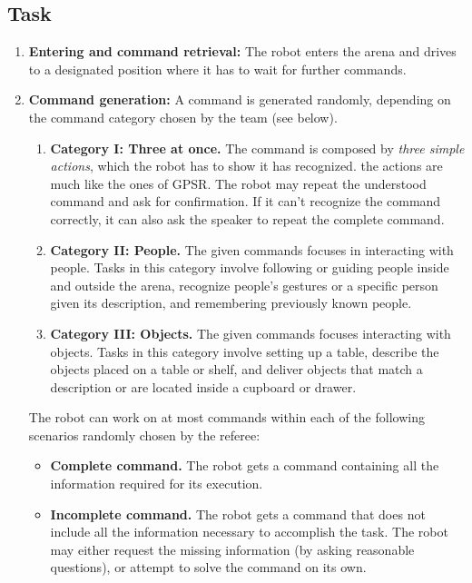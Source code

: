 \subsection{Task}

\begin{enumerate}
	\item \textbf{Entering and command retrieval:} The robot enters the arena and drives to a designated position where it has to wait for further commands. \\

	\item \textbf{Command generation:} A command is generated randomly, depending on the command category chosen by the team (see below). \\

	\begin{enumerate}
		\item \textbf{Category I: Three at once.} The command is composed by \textit{three simple actions}, which the robot has to show it has recognized. the actions are much like the ones of GPSR. The robot may repeat the understood command and ask for confirmation. If it can't recognize the command correctly, it can also ask the speaker to repeat the complete command.

		\item \textbf{Category II: People.} The given commands focuses in interacting with people. Tasks in this category involve following or guiding people inside and outside the arena, recognize people's gestures or a specific person given its description, and remembering previously known people.

		\item \textbf{Category III: Objects.} The given commands focuses interacting with objects. Tasks in this category involve setting up a table, describe the objects placed on a table or shelf, and deliver objects that match a description or are located inside a cupboard or drawer.
	\end{enumerate}
		
	The robot can work on at most \eegpsrMaxCmd commands within each of the following scenarios randomly chosen by the referee: \\

	\begin{itemize}
		\item \textbf{Complete command.} The robot gets a command containing all the information required for its execution.

		\item \textbf{Incomplete command.} The robot gets a command that does not include all the information necessary to accomplish the task. The robot may either request the missing information (by asking reasonable questions), or attempt to solve the command on its own.


\end{itemize}
\end{enumerate}
